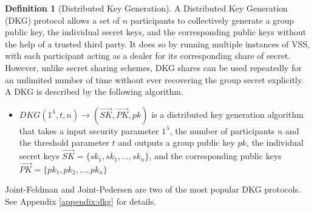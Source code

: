 \documentclass[letterpaper,twocolumn,10pt]{article}
\theoremstyle{definition}
\newtheorem{definition}[theorem]{Definition}
\theoremstyle{remark}
\begin{document}
\begin{definition}[Distributed Key Generation]
A Distributed Key Generation (DKG) \cite{gennaro1999secure, gennaro3revisiting} protocol allows a set of $n$ participants to collectively generate a group public key, the individual secret keys, and the corresponding public keys without the help of a trusted third party. It does so by running multiple instances of VSS, with each participant acting as a dealer for its corresponding share of secret. However, unlike secret sharing schemes, DKG shares can be used repeatedly for an unlimited number of time without ever recovering the group secret explicitly. A DKG is described by the following algorithm.
\begin{itemize}
    \item $DKG(1^{\lambda}, t, n) \rightarrow (\vec{SK}, \vec{PK}, pk)$ is a distributed key generation algorithm that takes a input security parameter $1^\lambda$, the number of participants $n$ and the threshold parameter $t$ and outputs a group public key $pk$, the individual secret keys $\vec{SK} = \{sk_1, sk_1, \ldots, sk_n\}$, and the corresponding public keys $\vec{PK} = \{pk_1, pk_2, \ldots, pk_n\}$
\end{itemize}
Joint-Feldman and Joint-Pedersen are two of the most popular DKG protocols. See Appendix \ref{appendix:dkg} for details.
\end{definition}
\end{document}
